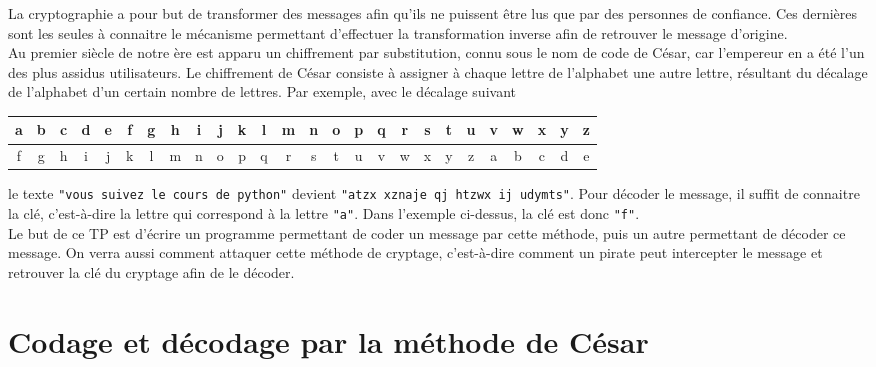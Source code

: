 \documentclass{magnolia}
\begin{document}
La cryptographie a pour but de transformer des messages afin qu'ils ne puissent être lus
que par des personnes de confiance. Ces dernières sont les seules à connaitre le
mécanisme permettant d'effectuer la transformation inverse afin de retrouver le message
d'origine.\\

Au premier siècle de notre ère est apparu un chiffrement par substitution, connu sous le
nom de code de César, car l'empereur en a été l'un des plus assidus utilisateurs.
Le chiffrement de César consiste à assigner à chaque lettre de l'alphabet une
autre lettre, résultant du décalage de l'alphabet d'un certain nombre de lettres. Par exemple, avec le décalage suivant
\begin{center}
\begin{tabular}{|*{26}{c|}}
\hline
a&b&c&d&e&f&g&h&i&j&k&l&m&n&o&p&q&r&s&t&u&v&w&x&y&z\\
\hline
f&g&h&i&j&k&l&m&n&o&p&q&r&s&t&u&v&w&x&y&z&a&b&c&d&e\\
\hline
\end{tabular}
\end{center}
le texte \verb_"vous suivez le cours de python"_ devient
\verb_"atzx xznaje qj htzwx ij udymts"_. Pour décoder le message, il suffit de connaitre
la clé, c'est-à-dire la lettre qui correspond à la lettre \verb_"a"_. Dans l'exemple
ci-dessus, la clé est donc \verb_"f"_.\\

Le but de ce TP est d'écrire un programme permettant de coder un message par cette
méthode, puis un autre permettant de décoder ce message. On verra aussi comment attaquer
cette méthode de cryptage, c'est-à-dire comment un pirate peut intercepter le message
et retrouver la clé du cryptage afin de le décoder. 

\section{Codage et décodage par la méthode de César}
\end{document}
